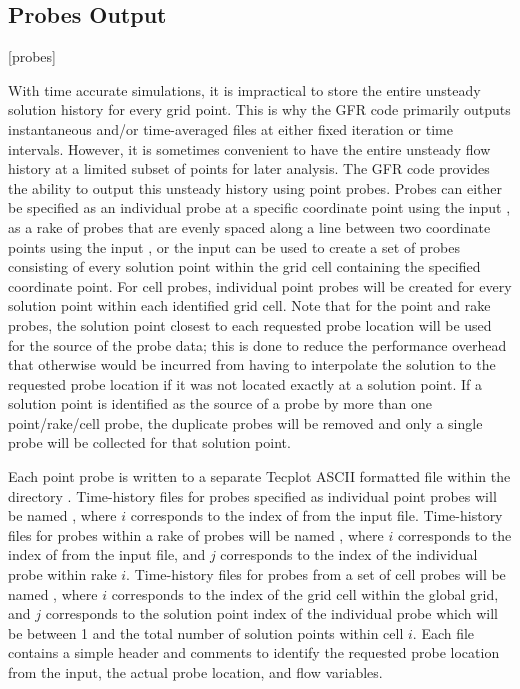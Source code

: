 \subsection{Probes Output}%
\label{SEC:Files:Probes_Output}
[probes]


With time accurate simulations, it is impractical to store the entire unsteady
solution history for every grid point.
%
This is why the GFR code primarily outputs instantaneous and/or time-averaged
files at either fixed iteration or time intervals.
%
However, it is sometimes convenient to have the entire unsteady flow history at
a limited subset of points for later analysis.
%
The GFR code provides the ability to output this unsteady history using point
probes.
%
Probes can either be specified as an individual probe at a specific coordinate
point using the input , as a rake of
probes that are evenly spaced along a line between two coordinate points using
the input , or the input
 can be used to create a set of probes
consisting of every solution point within the grid cell containing the specified
coordinate point.
%
For cell probes, individual point probes will be created for every solution
point within each identified grid cell.
%
Note that for the point and rake probes, the solution point closest to each
requested probe location will be used for the source of the probe data; this is
done to reduce the performance overhead that otherwise would be incurred from
having to interpolate the solution to the requested probe location if it was not
located exactly at a solution point.
%
If a solution point is identified as the source of a probe by more than one
point\slash rake\slash cell probe, the duplicate probes will be removed and only
a single probe will be collected for that solution point.


Each point probe is written to a separate Tecplot ASCII formatted file within
the directory .
%
Time-history files for probes specified as individual point probes will be named
, where $i$ corresponds to the index of
 from the input file.
%
Time-history files for probes within a rake of probes will be named
, where $i$ corresponds to the index of
 from the input file, and $j$
corresponds to the index of the individual probe within rake $i$.
%
Time-history files for probes from a set of cell probes will be named
, where $i$ corresponds to the index of the grid
cell within the global grid, and $j$ corresponds to the solution point index of
the individual probe which will be between 1 and the total number of solution
points within cell $i$.
%
Each file contains a simple header and comments to identify the requested probe
location from the input, the actual probe location, and flow variables.

